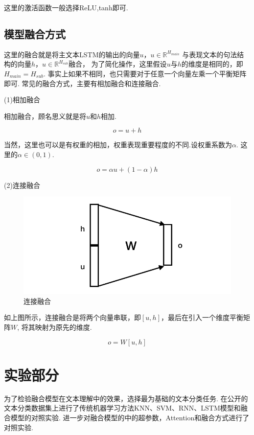 \documentclass[bachelor,winfonts]{jnuthesis}
\begin{document}
这里的激活函数一般选择ReLU,tanh即可.



\section{模型融合方式}
这里的融合就是将主文本LSTM的输出的向量$u$，$u \in \mathbb{R}^{H_{main}}$
与表现文本的句法结构的向量$h$，$u \in \mathbb{R}^{H_{sub}}$融合，
为了简化操作，这里假设$u$与$h$的维度是相同的，即$H_{main} = H_{sub}$.
事实上如果不相同，也只需要对于任意一个向量左乘一个平衡矩阵即可.
常见的融合方式，主要有相加融合和连接融合.

(1)相加融合

相加融合，顾名思义就是将$u$和$h$相加.

\begin{equation}
  o = u + h
\end{equation}

当然，这里也可以是有权重的相加，权重表现重要程度的不同.设权重系数为$\alpha$.
这里的$\alpha \in (0,1)$.

\begin{equation}
  o = \alpha u + (1-\alpha)h
\end{equation}

(2)连接融合

\begin{figure}[h!]
  \centering
  \includegraphics[width=0.4\linewidth]{连接融合.png}
  \caption{连接融合}
\end{figure}

如上图所示，连接融合是将两个向量串联，即$[u,h]$，最后在引入一个维度平衡矩阵$W$,
将其映射为原先的维度.

\begin{equation}
  o = W[u,h]
\end{equation}




\chapter{实验部分}
为了检验融合模型在文本理解中的效果，选择最为基础的文本分类任务.
在公开的文本分类数据集上进行了传统机器学习方法KNN、SVM、RNN、LSTM模型和融合模型的对照实验.
进一步对融合模型的中的超参数，Attention和融合方式进行了对照实验.
\end{document}
